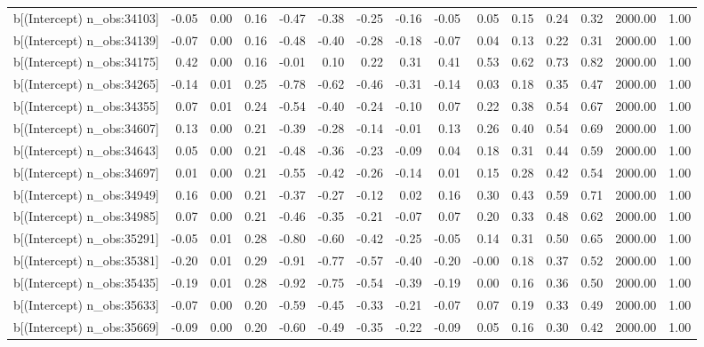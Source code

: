 \begin{table}[ht]
\begin{tabular}{rrrrrrrrrrrrrrr}
  b[(Intercept) n\_obs:34103] & -0.05 & 0.00 & 0.16 & -0.47 & -0.38 & -0.25 & -0.16 & -0.05 & 0.05 & 0.15 & 0.24 & 0.32 & 2000.00 & 1.00 \\ 
  b[(Intercept) n\_obs:34139] & -0.07 & 0.00 & 0.16 & -0.48 & -0.40 & -0.28 & -0.18 & -0.07 & 0.04 & 0.13 & 0.22 & 0.31 & 2000.00 & 1.00 \\ 
  b[(Intercept) n\_obs:34175] & 0.42 & 0.00 & 0.16 & -0.01 & 0.10 & 0.22 & 0.31 & 0.41 & 0.53 & 0.62 & 0.73 & 0.82 & 2000.00 & 1.00 \\ 
  b[(Intercept) n\_obs:34265] & -0.14 & 0.01 & 0.25 & -0.78 & -0.62 & -0.46 & -0.31 & -0.14 & 0.03 & 0.18 & 0.35 & 0.47 & 2000.00 & 1.00 \\ 
  b[(Intercept) n\_obs:34355] & 0.07 & 0.01 & 0.24 & -0.54 & -0.40 & -0.24 & -0.10 & 0.07 & 0.22 & 0.38 & 0.54 & 0.67 & 2000.00 & 1.00 \\ 
  b[(Intercept) n\_obs:34607] & 0.13 & 0.00 & 0.21 & -0.39 & -0.28 & -0.14 & -0.01 & 0.13 & 0.26 & 0.40 & 0.54 & 0.69 & 2000.00 & 1.00 \\ 
  b[(Intercept) n\_obs:34643] & 0.05 & 0.00 & 0.21 & -0.48 & -0.36 & -0.23 & -0.09 & 0.04 & 0.18 & 0.31 & 0.44 & 0.59 & 2000.00 & 1.00 \\ 
  b[(Intercept) n\_obs:34697] & 0.01 & 0.00 & 0.21 & -0.55 & -0.42 & -0.26 & -0.14 & 0.01 & 0.15 & 0.28 & 0.42 & 0.54 & 2000.00 & 1.00 \\ 
  b[(Intercept) n\_obs:34949] & 0.16 & 0.00 & 0.21 & -0.37 & -0.27 & -0.12 & 0.02 & 0.16 & 0.30 & 0.43 & 0.59 & 0.71 & 2000.00 & 1.00 \\ 
  b[(Intercept) n\_obs:34985] & 0.07 & 0.00 & 0.21 & -0.46 & -0.35 & -0.21 & -0.07 & 0.07 & 0.20 & 0.33 & 0.48 & 0.62 & 2000.00 & 1.00 \\ 
  b[(Intercept) n\_obs:35291] & -0.05 & 0.01 & 0.28 & -0.80 & -0.60 & -0.42 & -0.25 & -0.05 & 0.14 & 0.31 & 0.50 & 0.65 & 2000.00 & 1.00 \\ 
  b[(Intercept) n\_obs:35381] & -0.20 & 0.01 & 0.29 & -0.91 & -0.77 & -0.57 & -0.40 & -0.20 & -0.00 & 0.18 & 0.37 & 0.52 & 2000.00 & 1.00 \\ 
  b[(Intercept) n\_obs:35435] & -0.19 & 0.01 & 0.28 & -0.92 & -0.75 & -0.54 & -0.39 & -0.19 & 0.00 & 0.16 & 0.36 & 0.50 & 2000.00 & 1.00 \\ 
  b[(Intercept) n\_obs:35633] & -0.07 & 0.00 & 0.20 & -0.59 & -0.45 & -0.33 & -0.21 & -0.07 & 0.07 & 0.19 & 0.33 & 0.49 & 2000.00 & 1.00 \\ 
  b[(Intercept) n\_obs:35669] & -0.09 & 0.00 & 0.20 & -0.60 & -0.49 & -0.35 & -0.22 & -0.09 & 0.05 & 0.16 & 0.30 & 0.42 & 2000.00 & 1.00 \\ 

\end{tabular}
\end{table}
